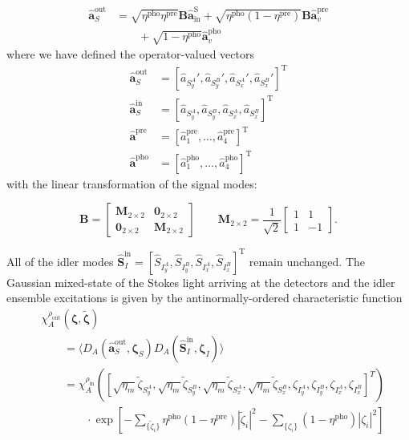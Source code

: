 \documentclass[aps,twocolumn,secnumarabic,amsmath,amssymb,pra,groupedaddress,
showpacs, showkeys]{revtex4-1}
\newcommand{\pna}[1]{\left(#1\right)}
\newcommand{\pnb}[1]{\left[#1\right]}
\newcommand{\eqn}[1]{
\begin{equation}
	#1
\end{equation}
}
\begin{document}
\begin{align}
\mathbf{\hat{a}}^{\textrm{out}}_S & = 
\sqrt{\eta^{\textrm{pho}}\eta^{\textrm{pre}}} \mathbf{B} \mathbf{\hat{a}}^{\textrm{S}}_{\textrm{in}}
+\sqrt{\eta^{\textrm{pho}}\pna{1-\eta^{\textrm{pre}}}}\mathbf{B} \mathbf{\hat{a}}^{\textrm{pre}}_v
 \nonumber \\ & \qquad +\sqrt{1-\eta^{\textrm{pho}}}\mathbf{\hat{a}}^{\textrm{pho}}_v
\end{align}
where we have defined the operator-valued vectors
\begin{align}
	\mathbf{\hat{a}}^{\textrm{out}}_S&=\pnb{\hat{a}_{S^A_y}',\hat{a}_{S^B_y}',\hat{a}_{S^A_x}',\hat{a}_{S^B_x}'}^{\textrm{T}} \nonumber\\
	\mathbf{\hat{a}}_{S}^{\textrm{in}}&=\pnb{\hat{a}_{S^A_y},\hat{a}_{S^B_y},\hat{a}_{S^A_x},\hat{a}_{S^B_x}}^{\textrm{T}} \nonumber\\
	\mathbf{\hat{a}}^{\textrm{pre}}&=\pnb{\hat{a}_1^{\textrm{pre}},\ldots, \hat{a}_4^{\textrm{pre}}}^{\textrm{T}} \nonumber\\
	\mathbf{\hat{a}}^{\textrm{pho}}&=\pnb{\hat{a}^{\textrm{pho}}_1,\ldots, \hat{a}^{\textrm{pho}}_4}^{\textrm{T}}
\end{align}
with the linear transformation of the signal modes:
\eqn{ 
\mathbf{B}=
\left[ 
\begin{array}{cc}
\mathbf{M}_{2\times 2} & \mathbf{0}_{2\times 2} \\
\mathbf{0}_{2\times 2} & \mathbf{M}_{2\times 2}
\end{array} 
\right]
\qquad 
\mathbf{M}_{2\times 2}=
\frac{1}{\sqrt{2}}\left[ 
\begin{array}{cc}
1 & 1 \\
1 & -1\end{array} \right].\label{eqn:chap3:linear_beamsplitter}}
All of the idler modes
$\mathbf{\hat{S}}_{{I}}^{\textrm{in}}=\pnb{\hat{S}_{I^A_y},\hat{S}_{I^B_y},\hat{S}_{I^A_x},\hat{S}_{I^B_x}}^{\textrm{T}}$
remain unchanged. The Gaussian mixed-state of the Stokes light arriving at the
detectors and the idler ensemble excitations is given by the
antinormally-ordered characteristic function
\begin{align}
	& \chi_A^{\rho_{\textrm{out}}}\pna{\bm{\zeta}, \bm{\tilde{\zeta}}}
        \nonumber \\
	& \qquad =\langle D_A\pna{\mathbf{\hat{a}}_S^{\textrm{out}}, \bm{\zeta}_S} D_A\pna{\mathbf{\hat{S}}_I^{\textrm{in}}, \bm{\zeta}_I} \rangle\nonumber \\
	& \qquad = \chi_A^{\rho_{\textrm{in}}}\pna{\pnb{\sqrt{\eta_{m}}\tilde{\zeta}_{S^A_y},\sqrt{\eta_{m}}\tilde{\zeta}_{S^B_y},\sqrt{\eta_{m}}\tilde{\zeta}_{S^A_x},\sqrt{\eta_{m}}\tilde{\zeta}_{S^B_x},
    \zeta_{I^A_y},\zeta_{I^B_y},\zeta_{I^A_x},\zeta_{I^B_x}}^{T}} \nonumber \\
    & \qquad \qquad \cdot \exp\pnb{-\sum_{\{\tilde{\zeta}_i\}}\eta^{\textrm{pho}}\pna{1- \eta^{\textrm{pre}}}|\tilde{\zeta}_i|^2-\sum_{\{{\zeta}_i\}}\pna{1-\eta^{\textrm{pho}}}|{\zeta}_i|^2} \label{eqn:chap3:chia_orig}
\end{align}
\end{document}
